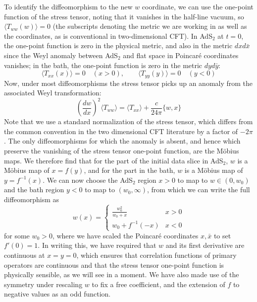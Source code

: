 \documentclass[12pt]{article}
\begin{document}
To identify the diffeomorphism to the new $w$ coordinate, we can use the one-point function of the stress tensor, noting that it vanishes in the half-line vacuum, so $\langle T_{ww}(w)\rangle=0$ (the subscripts denoting the metric we are working in as well as the coordinates, as is conventional in two-dimensional CFT). In AdS$_2$ at $t=0$, the one-point function is zero in the physical metric, and also in the metric $dxd\bar{x}$ since the Weyl anomaly between AdS$_2$ and flat space in Poincar\'e coordinates vanishes; in the bath, the one-point function is zero in the metric $dyd\bar{y}$:
\begin{equation}
	\langle T_{xx}(x) \rangle = 0 \quad (x>0),\qquad \langle T_{yy}(y) \rangle = 0\quad (y<0)
\end{equation}
Now, under most diffeomorphisms the stress tensor picks up an anomaly from the associated Weyl transformation:
\begin{equation}\label{eq:Schwwx}
	\left(\frac{dw}{dx}\right)^2 \langle T_{ww} \rangle = \langle T_{xx}\rangle +\frac{c}{24\pi}\{w,x\}
\end{equation}
Note that we use a standard normalization of the stress tensor, which differs from the common convention in the two dimensional CFT literature by a factor of $-2\pi$. The only diffeomorphisms for which the anomaly is absent, and hence which preserve the vanishing of the stress tensor one-point function, are the M\"obius maps. We therefore find that for the part of the initial data slice in AdS$_2$, $w$ is a M\"obius map of $x=f(y)$, and for the part in the bath, $w$ is a M\"obius map of $y=f^{-1}(x)$. We can now choose the AdS$_2$ region $x>0$ to map to $w\in (0,w_0)$ and the bath region $y<0$ to map to $(w_0,\infty)$, from which we can write the full diffeomorphism as
\begin{equation}
	w(x) = \begin{cases}
		\frac{w_0^2}{w_0+x} & x>0 \\
		w_0 +f^{-1}(-x) & x<0
	\end{cases}
\end{equation}
for some $w_0>0$, where we have scaled the Poincar\'e coordinates $x,\bar{x}$ to set $f'(0)=1$. In writing this, we have required that $w$ and its first derivative are continuous at $x=y=0$, which ensures that correlation functions of primary operators are continuous and that the stress tensor one-point function is physically sensible, as we will see in a moment. We have also made use of the symmetry under rescaling $w$ to fix a free coefficient, and the extension of $f$ to negative values as an odd function.
\end{document}

